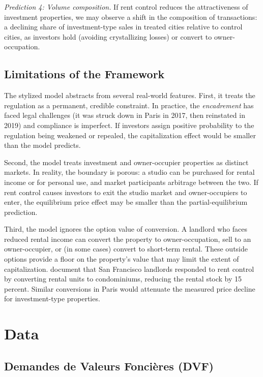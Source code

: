 \documentclass[12pt]{article}
\begin{document}
\emph{Prediction 4: Volume composition.} If rent control reduces the attractiveness of investment properties, we may observe a shift in the composition of transactions: a declining share of investment-type sales in treated cities relative to control cities, as investors hold (avoiding crystallizing losses) or convert to owner-occupation.

\subsection{Limitations of the Framework}

The stylized model abstracts from several real-world features. First, it treats the regulation as a permanent, credible constraint. In practice, the \emph{encadrement} has faced legal challenges (it was struck down in Paris in 2017, then reinstated in 2019) and compliance is imperfect. If investors assign positive probability to the regulation being weakened or repealed, the capitalization effect would be smaller than the model predicts.

Second, the model treats investment and owner-occupier properties as distinct markets. In reality, the boundary is porous: a studio can be purchased for rental income or for personal use, and market participants arbitrage between the two. If rent control causes investors to exit the studio market and owner-occupiers to enter, the equilibrium price effect may be smaller than the partial-equilibrium prediction.

Third, the model ignores the option value of conversion. A landlord who faces reduced rental income can convert the property to owner-occupation, sell to an owner-occupier, or (in some cases) convert to short-term rental. These outside options provide a floor on the property's value that may limit the extent of capitalization. \citet{diamond2019effects} document that San Francisco landlords responded to rent control by converting rental units to condominiums, reducing the rental stock by 15 percent. Similar conversions in Paris would attenuate the measured price decline for investment-type properties.


\section{Data}

\subsection{Demandes de Valeurs Fonci\`eres (DVF)}
\end{document}

